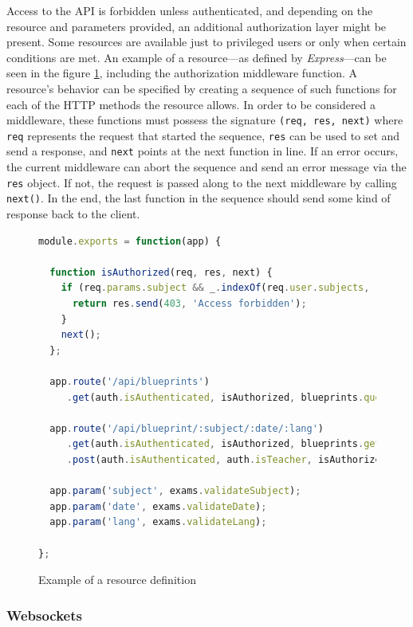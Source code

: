 \documentclass[thesis=M,english,hidelinks]{FITthesis}[2012/10/20]
\newcommand{\code}{\texttt}
\begin{document}
Access to the API is forbidden unless authenticated, and depending on the resource and parameters provided, an additional authorization layer might be present. Some resources are available just to privileged users or only when certain conditions are met. An example of a resource---as defined by \textit{Express}---can be seen in the figure \ref{fig:resource_example}, including the authorization middleware function. A resource's behavior can be specified by creating a sequence of such functions for each of the HTTP methods the resource allows. In order to be considered a middleware, these functions must possess the signature \code{(req, res, next)} where \code{req} represents the request that started the sequence, \code{res} can be used to set and send a response, and \code{next} points at the next function in line. If an error occurs, the current middleware can abort the sequence and send an error message via the \code{res} object. If not, the request is passed along to the next middleware by calling \code{next()}. In the end, the last function in the sequence should send some kind of response back to the client.

\begin{figure}
  \begin{lstlisting}[language=JavaScript]
module.exports = function(app) {

  function isAuthorized(req, res, next) {
    if (req.params.subject && _.indexOf(req.user.subjects, req.params.subject) === -1) {
      return res.send(403, 'Access forbidden');
    }
    next();
  };

  app.route('/api/blueprints')
     .get(auth.isAuthenticated, isAuthorized, blueprints.query);

  app.route('/api/blueprint/:subject/:date/:lang')
     .get(auth.isAuthenticated, isAuthorized, blueprints.get)
     .post(auth.isAuthenticated, auth.isTeacher, isAuthorized, blueprints.create);

  app.param('subject', exams.validateSubject);
  app.param('date', exams.validateDate);
  app.param('lang', exams.validateLang);

};
  \end{lstlisting}
  \caption{Example of a resource definition}
  \label{fig:resource_example}
\end{figure}

      \subsubsection{Websockets}
\end{document}
